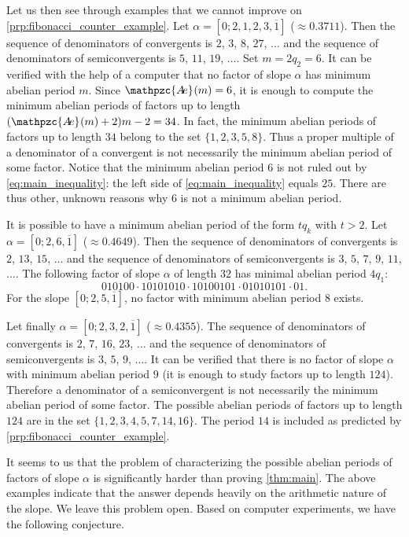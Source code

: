 \documentclass[a4paper,fleqn]{article}
\newcommand{\abexp}[2][]{\mathpzc{A\mkern-3mu e}_{#1}(#2)}
\begin{document}
  Let us then see through examples that we cannot improve on \autoref{prp:fibonacci_counter_example}. Let
  $\alpha = [0; 2, 1, 2, 3, \overline{1}]$ ($\approx 0.3711$). Then the sequence of denominators of convergents is $2$,
  $3$, $8$, $27$, $\ldots$ and the sequence of denominators of semiconvergents is $5$, $11$, $19$, $\ldots$. Set
  $m = 2q_2 = 6$. It can be verified with the help of a computer that no factor of slope $\alpha$ has minimum abelian
  period $m$. Since $\abexp{m} = 6$, it is enough to compute the minimum abelian periods of factors up to length
  $(\abexp{m} + 2)m - 2 = 34$. In fact, the minimum abelian periods of factors up to length $34$ belong to the set
  $\{1, 2, 3, 5, 8\}$. Thus a proper multiple of a denominator of a convergent is not necessarily the minimum abelian
  period of some factor. Notice that the minimum abelian period $6$ is not ruled out by \eqref{eq:main_inequality}: the
  left side of \eqref{eq:main_inequality} equals $25$. There are thus other, unknown reasons why $6$ is not a minimum
  abelian period.

  It is possible to have a minimum abelian period of the form $tq_k$ with $t > 2$. Let
  $\alpha = [0; 2, 6, \overline{1}]$ ($\approx 0.4649$). Then the sequence of denominators of convergents is $2$, $13$,
  $15$, $\ldots$ and the sequence of denominators of semiconvergents is $3$, $5$, $7$, $9$, $11$, $\ldots$. The
  following factor of slope $\alpha$ of length $32$ has minimal abelian period $4q_1$:
  \begin{equation*}
    010100 \cdot 10101010 \cdot 10100101 \cdot 01010101 \cdot 01.
  \end{equation*}
  For the slope $[0; 2, 5, \overline{1}]$, no factor with minimum abelian period $8$ exists.

  Let finally $\alpha = [0; 2, 3, 2, \overline{1}]$ ($\approx 0.4355$). The sequence of denominators of convergents is
  $2$, $7$, $16$, $23$, $\ldots$ and the sequence of denominators of semiconvergents is $3$, $5$, $9$, $\ldots$. It can
  be verified that there is no factor of slope $\alpha$ with minimum abelian period $9$ (it is enough to study factors
  up to length $124$). Therefore a denominator of a semiconvergent is not necessarily the minimum abelian period of
  some factor. The possible abelian periods of factors up to length $124$ are in the set
  $\{1, 2, 3, 4, 5, 7, 14, 16\}$. The period $14$ is included as predicted by \autoref{prp:fibonacci_counter_example}.

  It seems to us that the problem of characterizing the possible abelian periods of factors of slope $\alpha$ is
  significantly harder than proving \autoref{thm:main}. The above examples indicate that the answer depends heavily on
  the arithmetic nature of the slope. We leave this problem open. Based on computer experiments, we have the following
  conjecture.
\end{document}
